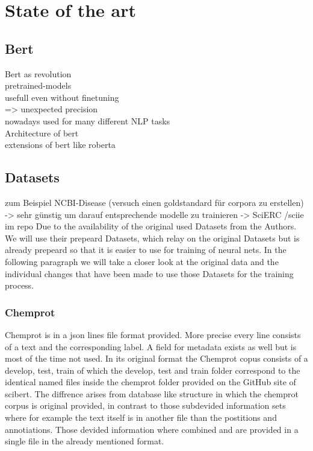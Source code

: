 \chapter{State of the art}
\section{Bert}
Bert as revolution\\
pretrained-models\\
usefull even without finetuning\\
=> unexpected precision\\

nowadays used for many different NLP tasks\\
Architecture of bert\\
extensions of bert like roberta\\
\section{Datasets}
zum Beispiel NCBI-Disease (versuch einen goldstandard für corpora zu erstellen)\\
-> sehr günstig um darauf entsprechende modelle zu trainieren \cite{Dogan2014}
-> SciERC /sciie im repo \cite{luan2018multitask}
Due to the availability of the original used Datasets from the Authors. We will use their prepeard Datasets, which relay on the original Datasets but is already prepeard so that it is easier to use for training of neural nets. In the following paragraph we will take a closer look at the original data and the individual changes that have been made to use those Datasets for the training process.
\subsection{Chemprot}
Chemprot is in a json lines file format provided. More precise every line consists of a text and the corresponding label. A field for metadata exists as well but is most of the time not used. In its original format the Chemprot copus consists of a develop, test, train of which the develop, test and train folder correspond to the identical named files inside the chemprot folder provided on the GitHub site of scibert. The diffrence arises from database like structure in which the chemprot corpus is original provided, in contrast to those subdevided information sets where for example the text itself is in another file than the postitions and annotiations. Those devided information where combined and are provided in a single file in the already mentioned format. \cite{Beltagy2019,Wang2016}
